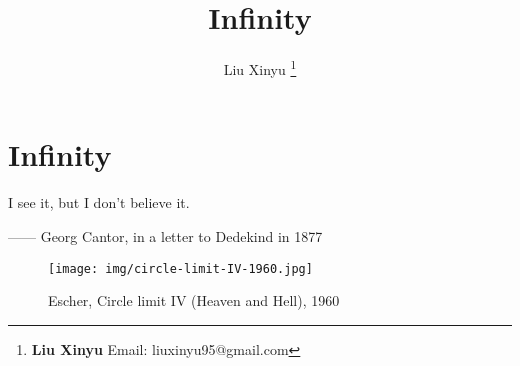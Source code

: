 \documentclass{article}
\begin{document}
\title{Infinity}

\author{Liu Xinyu
\thanks{{\bfseries Liu Xinyu} \newline
  Email: liuxinyu95@gmail.com \newline}
  }

\maketitle
\fi


\ifx\wholebook\relax
\chapter{Infinity}
\fi

\epigraph{I see it, but I don't believe it.}{ —— Georg Cantor, in a letter to Dedekind in 1877}


\begin{wrapfigure}{R}{0.5\textwidth}
 \centering
 \texttt{[image: img/circle-limit-IV-1960.jpg]}
 \captionsetup{labelformat=empty}
 \caption{Escher, Circle limit IV (Heaven and Hell), 1960}
 \label{fig:Circle-Limit-IV}
\end{wrapfigure}
\end{document}
